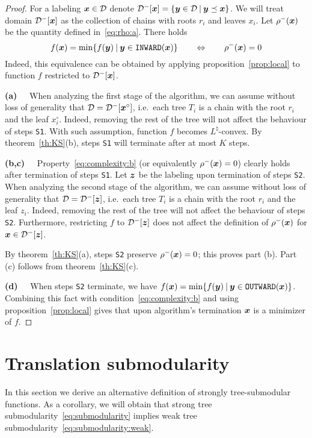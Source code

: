 \documentclass[11pt,onecolumn]{article}
\newcommand{\myparagraph}[1]{{\vspace*{2pt}\noindent\bf{#1}~~}}
\def\D{{\cal D}}
\def\INWARD{\texttt{INWARD}}
\def\OUTWARD{\texttt{OUTWARD}}
\newcommand{\bx}{\mbox{\boldmath $x$}}
\newcommand{\by}{\mbox{\boldmath $y$}}
\newcommand{\bz}{\mbox{\boldmath $z$}}
\begin{document}
\begin{proof}
For a labeling $\bx\in\D$ denote $\D^-[\bx]=\{\by\in\D\:|\:\by\preceq\bx\}$.
We will treat domain $\D^-[\bx]$ as the collection of chains with roots $r_i$ and leaves $x_i$. Let $\rho^-(\bx)$ be the quantity defined in~\eqref{eq:rho:a}. There holds
\begin{equation}
f(\bx)=\min \{f(\by)\:|\:\by\in\INWARD(\bx)\}\qquad \Leftrightarrow \qquad \rho^-(\bx)=0
\label{eq:StwoInv}
\end{equation}
Indeed, this equivalence can be obtained by applying proposition~\ref{prop:local} to function $f$ restricted to $\D^-[\bx]$.

\myparagraph{(a)}
When analyzing the first stage of the algorithm, we can assume without loss of generality
that $\D=\D^-[\bx^\circ]$, i.e.\ each tree $T_i$ is a chain with the root $r_i$ and
the leaf $x^\circ_i$. 
Indeed, removing the rest of the tree will not affect the behaviour of steps {\tt S1}.
With such assumption, function $f$ becomes $L^\natural$-convex. 
By theorem~\ref{th:KS}(b), steps {\tt S1} will terminate after at most $K$ steps.

\myparagraph{(b,c)} Property~\eqref{eq:complexity:b} (or equivalently $\rho^-(\bx)=0$) clearly
holds after termination of steps {\tt S1}. Let $\bz$ be the labeling upon
termination of steps {\tt S2}. 
When analyzing the second stage of the algorithm, we can assume without loss of generality
that $\D=\D^-[\bz]$, i.e.\ each tree $T_i$ is a chain with the root $r_i$ and
the leaf $z_i$. 
Indeed, removing the rest of the tree will not affect the behaviour of steps {\tt S2}.
Furthermore, restricting $f$ to $\D^-[\bz]$ does not affect the definition of $\rho^-(\bx)$ for $\bx\in\D^-[\bz]$.

By theorem~\ref{th:KS}(a), steps {\tt S2} preserve $\rho^-(\bx)=0$; this proves part (b).
Part (c) follows from theorem~\ref{th:KS}(c).

\myparagraph{(d)} When steps {\tt S2} terminate, we have $f(\bx)=\min \{f(\by)\:|\:\by\in\OUTWARD(\bx)\}$.
Combining this fact with condition~\eqref{eq:complexity:b} and using proposition~\ref{prop:local}
gives that upon algorithm's termination $\bx$ is a minimizer of $f$.

\end{proof}




\section{Translation submodularity}\label{sec:sw}
In this section we derive an alternative definition of strongly tree-submodular functions.
As a corollary, we will obtain that strong tree submodularity~\eqref{eq:submodularity}
implies weak tree submodularity~\eqref{eq:submodularity:weak}.
\end{document}
